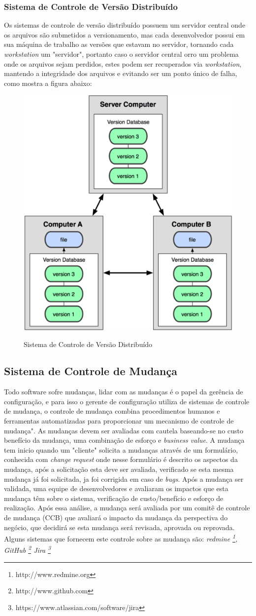 \subsubsection{Sistema de Controle de Versão Distribuído}Os sistemas de controle de versão distribuído possuem um servidor central onde os arquivos são submetidos a versionamento, mas cada desenvolvedor possui em sua máquina de trabalho as versões que estavam no servidor, tornando cada \textit{workstation} um "servidor", portanto caso o servidor central orro um problema onde os arquivos sejam perdidos, estes podem ser recuperados via \textit{workstation}, mantendo a integridade dos arquivos e evitando ser um ponto único de falha, como mostra a figura abaixo:
\begin{figure}[tbh]
\centering
\caption[Sistema de Controle de Versão Distribuído]{Sistema de Controle de Versão Distribuído}
\includegraphics[width=0.4\linewidth]{./images/scvdist}
\label{fig:SCVDistribuido}
\end{figure}
\subsection{Sistema de Controle de Mudança}
Todo software sofre mudanças, lidar com as mudanças é o papel da gerência de configuração, e para isso o gerente de configuração utiliza de sistemas de controle de mudança, o controle de mudança combina procedimentos humanos e ferramentas automatizadas para proporcionar um mecanismo de controle de mudança".  As mudanças devem ser avaliadas com cautela baseando-se no custo benefício da mudança, uma combinação de esforço e \textit{business value}. A mudança tem inicio quando um "cliente" solicita a mudanças através de um formulário, conhecida com \textit{change request} onde nesse formulário é descrito os aspectos da mudança, após a solicitação esta deve ser avaliada, verificado se esta mesma mudança já foi solicitada, ja foi corrigida em caso de \textit{bugs}. Após a mudança ser validada, uma equipe de desenvolvedores e avaliaram os impactos que esta mudança têm sobre o sistema, verificação de custo/benefício e esforço de realização. \cite{sommerville2011} Após essa análise, a mudança será avaliada por um comitê de controle de mudança (CCB) que avaliará o impacto da mudança da perspectiva do negócio, que decidirá se esta mudança será revisada, aprovada ou reprovada. Alguns sistemas que fornecem este controle sobre as mudança são: \textit{redmine \footnote{http://www.redmine.org}, GitHub \footnote{http://www.github.com} Jira \footnote{https://www.atlassian.com/software/jira}}
